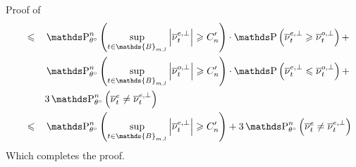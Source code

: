 \begin{pro}{Proof of \\}
\begin{alignat*}{3}
& && \leq && \P_{\theta^{\circ}}^{n}\left(\sup\limits_{t \in \mathds{B}_{m, l}} \left\vert \overline{\nu}_{t}^{e, \perp} \right\vert \geq C_{n}' \right)\cdot \P\left(\overline{\nu}_{t}^{e, \perp}\geq \overline{\nu}_{t}^{o, \perp}\right) +\notag\\
& && && \P_{\theta^{\circ}}^{n}\left(\sup\limits_{t \in \mathds{B}_{m, l}} \left\vert \overline{\nu}_{t}^{o, \perp}  \right\vert \geq C_{n}' \right)\cdot \P\left(\overline{\nu}_{t}^{e, \perp}\leq \overline{\nu}_{t}^{o, \perp}\right) + \notag\\
& && && 3 \P_{\theta^{\circ}}^{n}\left(\overline{\nu}_{t}^{e} \neq \overline{\nu}_{t}^{e, \perp}\right)\notag\\
& && \leq && \P_{\theta^{\circ}}^{n}\left(\sup\limits_{t \in \mathds{B}_{m, l}} \left\vert \overline{\nu}_{t}^{e, \perp} \right\vert \geq C_{n}' \right) + 3 \P_{\theta^{\circ}}^{n}\left(\overline{\nu}_{t}^{e} \neq \overline{\nu}_{t}^{e, \perp}\right)
\end{alignat*}
Which completes the proof.

\qedsymbol
\end{pro}



